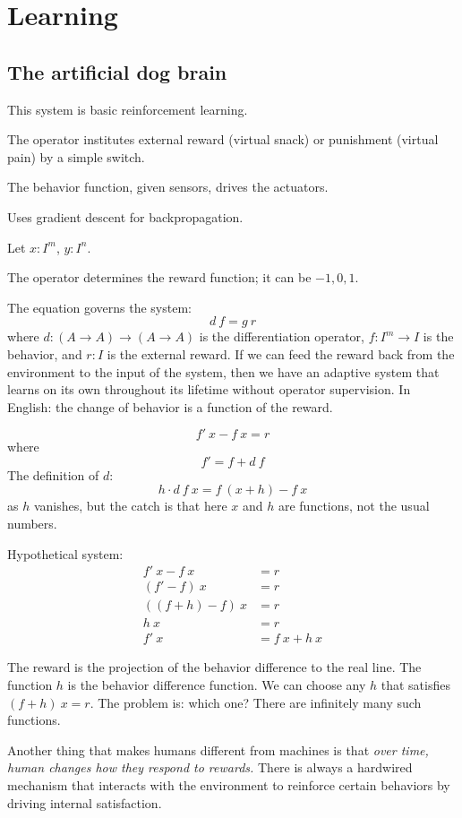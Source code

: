 \chapter{Learning}

\section{The artificial dog brain}

This system is basic reinforcement learning.

The operator institutes external reward
(virtual snack) or punishment (virtual pain)
by a simple switch.

The behavior function, given sensors, drives the actuators.

Uses gradient descent for backpropagation.

Let \( x : I^m \), \( y : I^n \).

The operator determines the reward function;
it can be \(-1,0,1\).

The equation governs the system:
\[
    d~f = g~r
\]
where \(d : (A \to A) \to (A \to A)\) is the differentiation operator,
\( f : I^m \to I \) is the behavior,
and \( r : I \) is the external reward.
If we can feed the reward back from
the environment to the input of the system,
then we have an adaptive system that
learns on its own throughout its lifetime without operator supervision.
In English: the change of behavior is a function of the reward.

\[
    f'~x - f~x = r
\]
where
\[
    f' = f + d~f
\]
The definition of \(d\):
\[
    h \cdot d~f~x = f~(x+h) - f~x
\]
as \(h\) vanishes,
but the catch is that
here \(x\) and \(h\) are functions, not the usual numbers.

Hypothetical system:
\begin{align*}
    f'~x - f~x &= r
    \\
    (f' - f)~x &= r
    \\
    ((f + h) - f)~x &= r
    \\
    h~x &= r
    \\
    f'~x &= f~x + h~x
\end{align*}

The reward is the projection of the behavior difference to the real line.
The function \(h\) is the behavior difference function.
We can choose any \(h\) that satisfies \((f + h)~x = r\).
The problem is: which one?
There are infinitely many such functions.

Another thing that makes humans different from machines is that
\emph{over time, human changes how they respond to rewards.}
There is always a hardwired mechanism that interacts with the environment
to reinforce certain behaviors by driving internal satisfaction.

